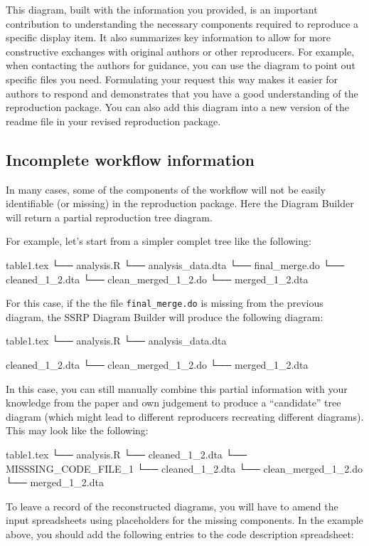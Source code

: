 \documentclass[]{book}
\begin{document}
This diagram, built with the information you provided, is an important contribution to understanding the necessary components required to reproduce a specific display item. It also summarizes key information to allow for more constructive exchanges with original authors or other reproducers. For example, when contacting the authors for guidance, you can use the diagram to point out specific files you need. Formulating your request this way makes it easier for authors to respond and demonstrates that you have a good understanding of the reproduction package. You can also add this diagram into a new version of the readme file in your revised reproduction package.

\hypertarget{incomplete-workflow-information}{%
\subsection{Incomplete workflow information}\label{incomplete-workflow-information}}

In many cases, some of the components of the workflow will not be easily identifiable (or missing) in the reproduction package. Here the Diagram Builder will return a partial reproduction tree diagram.

For example, let's start from a simpler complet tree like the following:

table1.tex
└── analysis.R
└── analysis\_data.dta
└── final\_merge.do
└── cleaned\_1\_2.dta
└── clean\_merged\_1\_2.do
└── merged\_1\_2.dta

For this case, if the the file \texttt{final\_merge.do} is missing from the previous diagram, the SSRP Diagram Builder will produce the following diagram:

table1.tex
└── analysis.R
└── analysis\_data.dta

cleaned\_1\_2.dta
└── clean\_merged\_1\_2.do
└── merged\_1\_2.dta

In this case, you can still manually combine this partial information with your knowledge from the paper and own judgement to produce a ``candidate'' tree diagram (which might lead to different reproducers recreating different diagrams). This may look like the following:

table1.tex
└── analysis.R
└── cleaned\_1\_2.dta
└── MISSSING\_CODE\_FILE\_1
└── cleaned\_1\_2.dta
└── clean\_merged\_1\_2.do
└── merged\_1\_2.dta

To leave a record of the reconstructed diagrams, you will have to amend the input spreadsheets using placeholders for the missing components. In the example above, you should add the following entries to the code description spreadsheet:
\end{document}
